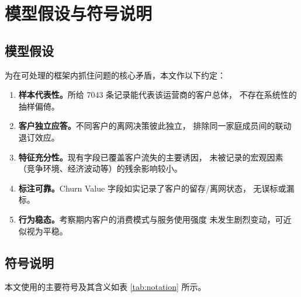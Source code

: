 \section{模型假设与符号说明}

\subsection{模型假设}

为在可处理的框架内抓住问题的核心矛盾，本文作以下约定：

\begin{enumerate}
    \item \textbf{样本代表性。}所给 7043 条记录能代表该运营商的客户总体，
    不存在系统性的抽样偏倚。
    \item \textbf{客户独立应答。}不同客户的离网决策彼此独立，
    排除同一家庭成员间的联动退订效应。
    \item \textbf{特征充分性。}现有字段已覆盖客户流失的主要诱因，
    未被记录的宏观因素（竞争环境、经济波动等）的残余影响较小。
    \item \textbf{标注可靠。}Churn Value 字段如实记录了客户的留存/离网状态，
    无误标或漏标。
    \item \textbf{行为稳态。}考察期内客户的消费模式与服务使用强度
    未发生剧烈变动，可近似视为平稳。
\end{enumerate}

\subsection{符号说明}

本文使用的主要符号及其含义如表 \ref{tab:notation} 所示。

